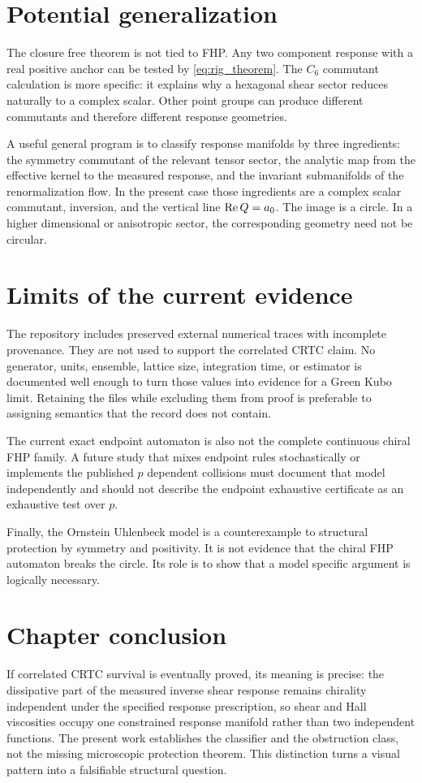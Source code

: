 \section{Potential generalization}
The closure free theorem is not tied to FHP. Any two component response with a real positive anchor can be tested by \cref{eq:rig_theorem}. The $C_6$ commutant calculation is more specific: it explains why a hexagonal shear sector reduces naturally to a complex scalar. Other point groups can produce different commutants and therefore different response geometries.

A useful general program is to classify response manifolds by three ingredients: the symmetry commutant of the relevant tensor sector, the analytic map from the effective kernel to the measured response, and the invariant submanifolds of the renormalization flow. In the present case those ingredients are a complex scalar commutant, inversion, and the vertical line $\operatorname{Re} Q=a_0$. The image is a circle. In a higher dimensional or anisotropic sector, the corresponding geometry need not be circular.

\section{Limits of the current evidence}
The repository includes preserved external numerical traces with incomplete provenance. They are not used to support the correlated CRTC claim. No generator, units, ensemble, lattice size, integration time, or estimator is documented well enough to turn those values into evidence for a Green Kubo limit. Retaining the files while excluding them from proof is preferable to assigning semantics that the record does not contain.

The current exact endpoint automaton is also not the complete continuous chiral FHP family. A future study that mixes endpoint rules stochastically or implements the published $p$ dependent collisions must document that model independently and should not describe the endpoint exhaustive certificate as an exhaustive test over $p$.

Finally, the Ornstein Uhlenbeck model is a counterexample to structural protection by symmetry and positivity. It is not evidence that the chiral FHP automaton breaks the circle. Its role is to show that a model specific argument is logically necessary.

\section{Chapter conclusion}
If correlated CRTC survival is eventually proved, its meaning is precise: the dissipative part of the measured inverse shear response remains chirality independent under the specified response prescription, so shear and Hall viscosities occupy one constrained response manifold rather than two independent functions. The present work establishes the classifier and the obstruction class, not the missing microscopic protection theorem. This distinction turns a visual pattern into a falsifiable structural question.

